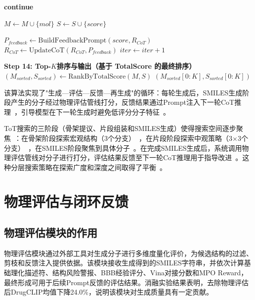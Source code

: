 \begin{algorithm}
\begin{algorithmic}[1]
                \State {}
                    \State \textbf{continue} 
                    \State {}
                \EndIf

                \State $M \leftarrow M \cup \{mol\}$
                \State $S \leftarrow S \cup \{score\}$

                \State {}
                \State $P_{feedback} \leftarrow \text{BuildFeedbackPrompt}(score, R_{CoT})$
                \State $R_{CoT} \leftarrow \text{UpdateCoT}(R_{CoT}, P_{feedback})$
            \EndIf
        \EndFor
    \EndFor
    \State $iter \leftarrow iter + 1$
\EndWhile

\State \textbf{Step 14: Top-$K$排序与输出（基于 TotalScore 的最终排序）}
\State $(M_{sorted}, S_{sorted}) \leftarrow \text{RankByTotalScore}(M, S)$
\State \Return $(M_{sorted}[0:K], S_{sorted}[0:K])$
\end{algorithmic}
\end{algorithm}

该算法实现了"生成—评估—反馈—再生成"的循环：每轮生成后，SMILES生成阶段产生的分子经过物理评估管线打分，反馈结果通过Prompt注入下一轮CoT推理~\cite{Yao2023}，引导模型在下一轮生成时避免低评分分子特征~\cite{Yao2023}。

ToT搜索的三阶段（骨架提议、片段组装和SMILES生成）使得搜索空间逐步聚焦~\cite{Yao2023}：在骨架阶段探索宏观结构（3个分支）~\cite{Yao2023}，在片段阶段探索中观策略（3×3个分支）~\cite{Yao2023}，在SMILES阶段聚焦到具体分子~\cite{Yao2023}。在完成SMILES生成后，系统调用物理评估管线对分子进行打分，评估结果反馈至下一轮CoT推理用于指导改进~\cite{Yao2023}。这种分层搜索策略在探索广度和深度之间取得了平衡~\cite{Yao2023}。

\section{物理评估与闭环反馈}\label{sec:physics-evaluation}

\subsection{物理评估模块的作用}

物理评估模块通过外部工具对生成分子进行多维度量化评价，为候选结构的过滤、剪枝和反馈注入提供依据。该模块接收生成得到的SMILES字符串，并依次计算基础理化描述符、结构风险警报、BBB经验评分、Vina对接分数和MPO Reward，最终形成可用于后续Prompt反馈的评估结果。消融实验结果表明，去除物理评估后DrugCLIP均值下降24.0\%，说明该模块对生成质量具有一定贡献。

